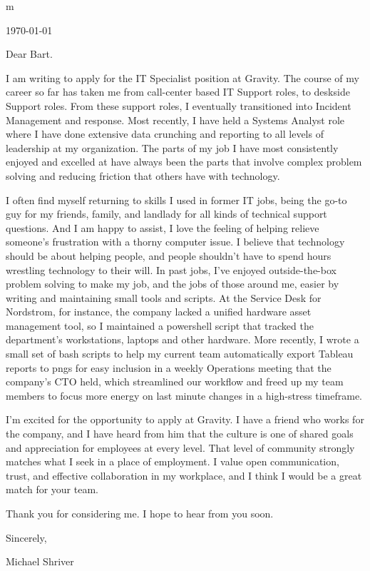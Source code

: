 \documentclass[10pt,oneside]{article}
\begin{document}
m

\hfill\dte\today
\heading
\vspace{\baselineskip}
\vspace{\baselineskip}

Dear Bart.

\vspace{\baselineskip}

I am writing to apply for the IT Specialist position at Gravity. The course of my career so far has taken me from call-center based IT Support roles, to deskside Support roles. From these support roles, I eventually transitioned into Incident Management and response. Most recently, I have held a Systems Analyst role where I have done extensive data crunching and reporting to all levels of leadership at my organization. The parts of my job I have most consistently enjoyed and excelled at have always been the parts that involve complex problem solving and reducing friction that others have with technology.

\vspace{\baselineskip}

I often find myself returning to skills I used in former IT jobs, being the go-to guy for my friends, family, and landlady for all kinds of technical support questions. And I am happy to assist, I love the feeling of helping relieve someone’s frustration with a thorny computer issue. I believe that technology should be about helping people, and people shouldn’t have to spend hours wrestling technology to their will. In past jobs, I’ve enjoyed outside-the-box problem solving to make my job, and the jobs of those around me, easier by writing and maintaining small tools and scripts. At the Service Desk for Nordstrom, for instance, the company lacked a unified hardware asset management tool, so I maintained a powershell script that tracked the department’s workstations, laptops and other hardware. More recently, I wrote a small set of bash scripts to help my current team automatically export Tableau reports to pngs for easy inclusion in a weekly Operations meeting that the company’s CTO held, which streamlined our workflow and freed up my team members to focus more energy on last minute changes in a high-stress timeframe.

\vspace{\baselineskip}

I’m excited for the opportunity to apply at Gravity. I have a friend who works for the company, and I have heard from him that the culture is one of shared goals and appreciation for employees at every level. That level of community strongly matches what I seek in a place of employment. I value open communication, trust, and effective collaboration in my workplace, and I think I would be a great match for your team.

\vspace{\baselineskip}

Thank you for considering me. I hope to hear from you soon.

\vspace{\baselineskip}

Sincerely,

\vspace{\baselineskip}

Michael Shriver
\end{document}
